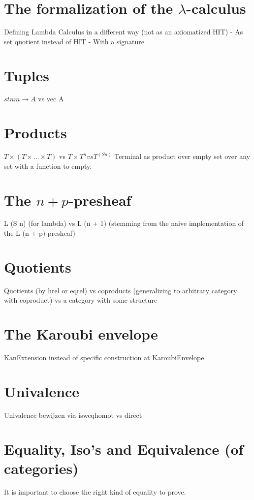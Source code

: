 \section{The formalization of the \texorpdfstring{$ \lambda $}{lambda}-calculus}
Defining Lambda Calculus in a different way (not as an axiomatized HIT)
  - As set quotient instead of HIT
  - With a signature

\section{Tuples}
$ stn m \to A $ vs vec A

\section{Products}
$ T \times (T \times \dots \times T) $ vs $ T \times T^n vs T^(S n) $
Terminal as product over empty set
over any set with a function to empty.

\section{The \texorpdfstring{$ n + p $}{n + p}-presheaf}
L (S n) (for lambda) vs L (n + 1) (stemming from the naive implementation of the L (n + p) presheaf)

\section{Quotients}
Quotients (by hrel or eqrel) vs coproducts (generalizing to arbitrary category with coproduct) vs a category with some structure

\section{The Karoubi envelope}
KanExtension instead of specific construction at KaroubiEnvelope

\section{Univalence}
Univalence bewijzen via isweqhomot vs direct

\section{Equality, Iso's and Equivalence (of categories)}
It is important to choose the right kind of equality to prove.
